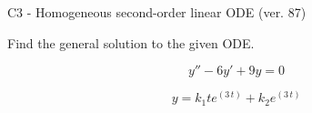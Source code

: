 \begin{exercise}
  \begin{exerciseTitle}C3 - Homogeneous second-order linear ODE (ver. 87)\end{exerciseTitle}
  \begin{exerciseStatement}
    
Find the general solution to the given ODE.

    
\[y''-6y'+9y = 0\]

  \end{exerciseStatement}
  \begin{exerciseAnswer}
    
\[y= k_{1} t e^{\left(3 \, t\right)} + k_{2} e^{\left(3 \, t\right)}\]

  \end{exerciseAnswer}
\end{exercise}